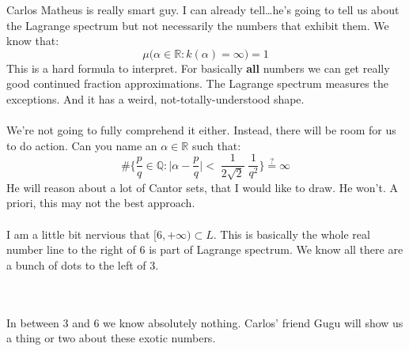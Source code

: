 \documentclass[12pt]{article}
\begin{document}
\newpage

\noindent Carlos Matheus is really smart guy.  I can already tell\dots  he's going to tell us about the Lagrange spectrum but not necessarily the numbers that exhibit them. We know that: 
$$ \mu \big( \alpha \in \mathbb{R} : k(\alpha) = \infty \big) = 1 $$
This is a hard formula to interpret.  For basically \textbf{all} numbers we can get really good continued fraction approximations.  The Lagrange spectrum measures the exceptions.  And it has a weird, not-totally-understood shape.\\ \\
We're not going to fully comprehend it either.  Instead, there will be room for us to do action. Can  you name an $\alpha \in \mathbb{R}$ such that:
$$ \# \bigg\{ \frac{p}{q} \in \mathbb{Q} : \Big|  \alpha - \frac{p}{q} \Big| <  \;\frac{1}{2\sqrt{2}}\;\frac{1}{q^2} \bigg\} \stackrel{?}{=} \infty $$
He will reason about a lot of Cantor sets, that I would like to draw.  He won't. A priori, this may not the best approach.  \\ \\
I am a little bit nervious that $[6, +\infty) \subset L$.  This is basically the whole real number line to the right of 6 is part of Lagrange spectrum.  We know all there are a bunch of dots to the left of 3.   \\ \\
 \\ 
In between 3 and 6 we know absolutely nothing.  Carlos' friend Gugu will show us a thing or two about these exotic numbers.

\vfill 
\end{document}
